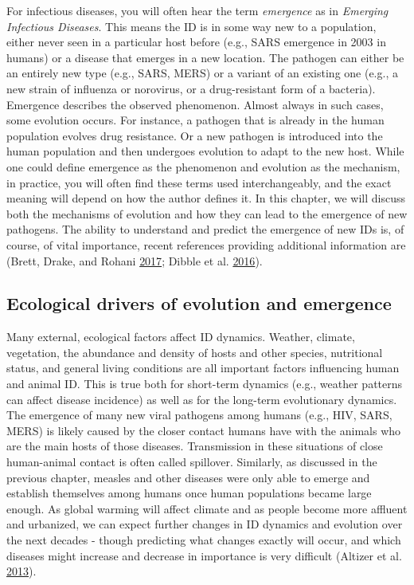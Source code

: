 \documentclass[]{article}
\theoremstyle{definition}
\theoremstyle{definition}
\theoremstyle{definition}
\theoremstyle{remark}
\begin{document}
For infectious diseases, you will often hear the term \emph{emergence}
as in \emph{Emerging Infectious Diseases}. This means the ID is in some
way new to a population, either never seen in a particular host before
(e.g., SARS emergence in 2003 in humans) or a disease that emerges in a
new location. The pathogen can either be an entirely new type (e.g.,
SARS, MERS) or a variant of an existing one (e.g., a new strain of
influenza or norovirus, or a drug-resistant form of a bacteria).
Emergence describes the observed phenomenon. Almost always in such
cases, some evolution occurs. For instance, a pathogen that is already
in the human population evolves drug resistance. Or a new pathogen is
introduced into the human population and then undergoes evolution to
adapt to the new host. While one could define emergence as the
phenomenon and evolution as the mechanism, in practice, you will often
find these terms used interchangeably, and the exact meaning will depend
on how the author defines it. In this chapter, we will discuss both the
mechanisms of evolution and how they can lead to the emergence of new
pathogens. The ability to understand and predict the emergence of new
IDs is, of course, of vital importance, recent references providing
additional information are (Brett, Drake, and Rohani
\protect\hyperlink{ref-brett17}{2017}; Dibble et al.
\protect\hyperlink{ref-dibble16}{2016}).

\subsection{Ecological drivers of evolution and
emergence}\label{ecological-drivers-of-evolution-and-emergence}

Many external, ecological factors affect ID dynamics. Weather, climate,
vegetation, the abundance and density of hosts and other species,
nutritional status, and general living conditions are all important
factors influencing human and animal ID. This is true both for
short-term dynamics (e.g., weather patterns can affect disease
incidence) as well as for the long-term evolutionary dynamics. The
emergence of many new viral pathogens among humans (e.g., HIV, SARS,
MERS) is likely caused by the closer contact humans have with the
animals who are the main hosts of those diseases. Transmission in these
situations of close human-animal contact is often called spillover.
Similarly, as discussed in the previous chapter, measles and other
diseases were only able to emerge and establish themselves among humans
once human populations became large enough. As global warming will
affect climate and as people become more affluent and urbanized, we can
expect further changes in ID dynamics and evolution over the next
decades - though predicting what changes exactly will occur, and which
diseases might increase and decrease in importance is very difficult
(Altizer et al. \protect\hyperlink{ref-altizer13}{2013}).
\end{document}

